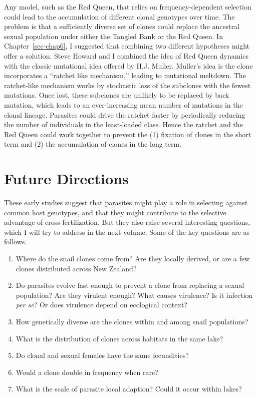 \documentclass[
  letterpaper,
]{book}
\providecommand{\tightlist}{%
  \setlength{\itemsep}{0pt}\setlength{\parskip}{0pt}}\usepackage{longtable,booktabs,array}
\begin{document}
Any model, such as the Red Queen, that relies on frequency-dependent
selection could lead to the accumulation of different clonal genotypes
over time. The problem is that a sufficiently diverse set of clones
could replace the ancestral sexual population under either the Tangled
Bank or the Red Queen. In Chapter~\ref{sec-chap6}, I suggested that
combining two different hypotheses might offer a solution. Steve Howard
and I combined the idea of Red Queen dynamics with the classic
mutational idea offered by H.J. Muller. Muller's idea is the clone
incorporates a ``ratchet like mechanism,'' leading to mutational
meltdown. The ratchet-like mechanism works by stochastic loss of the
subclones with the fewest mutations. Once lost, these subclones are
unlikely to be replaced by back mutation, which leads to an
ever-increasing mean number of mutations in the clonal lineage.
Parasites could drive the ratchet faster by periodically reducing the
number of individuals in the least-loaded class. Hence the ratchet and
the Red Queen could work together to prevent the (1) fixation of clones
in the short term and (2) the accumulation of clones in the long term.

\section{Future Directions}\label{future-directions}

These early studies suggest that parasites might play a role in
selecting against common host genotypes, and that they might contribute
to the selective advantage of cross-fertilization. But they also raise
several interesting questions, which I will try to address in the next
volume. Some of the key questions are as follows.

\begin{enumerate}
\def\labelenumi{\arabic{enumi}.}
\tightlist
\item
  Where do the snail clones come from? Are they locally derived, or are
  a few clones distributed across New Zealand?\\
\item
  Do parasites evolve fast enough to prevent a clone from replacing a
  sexual population? Are they virulent enough? What causes virulence? Is
  it infection \emph{per se}? Or does virulence depend on ecological
  context?
\item
  How genetically diverse are the clones within and among snail
  populations?\\
\item
  What is the distribution of clones across habitats in the same lake?\\
\item
  Do clonal and sexual females have the same fecundities?\\
\item
  Would a clone double in frequency when rare?\\
\item
  What is the scale of parasite local adaption? Could it occur within
  lakes?
\end{enumerate}
\end{document}
